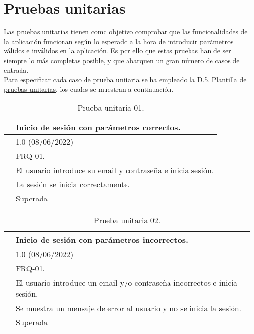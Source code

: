\section{Pruebas unitarias}

Las pruebas unitarias \cite{pruebaunitaria} tienen como objetivo comprobar que las funcionalidades de la aplicación funcionan según lo esperado a la hora de introducir parámetros válidos e inválidos en la aplicación. Es por ello que estas pruebas han de ser siempre lo más completas posible, y que abarquen un gran número de casos de entrada. 
\\

Para especificar cada caso de prueba unitaria se ha empleado la \hyperref[enlacePUX]{D.5. Plantilla de pruebas unitarias}, los cuales se muestran a continuación.

\begin{table}[H]
\begin{center}
\begin{tabular}{|p{3cm}|p{10cm}|} \hline
\centering {\bf PU-01} & Inicio de sesión con parámetros correctos.  \\ \hline\hline
\centering {\bf Versión} & 1.0 (08/06/2022) \\ \hline
\centering {\bf Dependencias} &  FRQ-01. \\ \hline
\centering {\bf Descripción} &  El usuario introduce su email y contraseña e inicia sesión. \\ \hline
\centering {\bf Criterio de aceptación} & La sesión se inicia correctamente. \\ \hline
\centering {\bf Estado} & Superada \\ \hline
\end{tabular}
\caption{Prueba unitaria 01.}
\label{enlacePU1}
\end{center}
\end{table}

\begin{table}[H]
\begin{center}
\begin{tabular}{|p{3cm}|p{10cm}|} \hline
\centering {\bf PU-02} & Inicio de sesión con parámetros incorrectos.  \\ \hline\hline
\centering {\bf Versión} & 1.0 (08/06/2022) \\ \hline
\centering {\bf Dependencias} & FRQ-01. \\ \hline
\centering {\bf Descripción} &  El usuario introduce un email y/o contraseña incorrectos e inicia sesión. \\ \hline
\centering {\bf Criterio de aceptación} & Se muestra un mensaje de error al usuario y no se inicia la sesión. \\ \hline
\centering {\bf Estado} & Superada \\ \hline
\end{tabular}
\caption{Prueba unitaria 02.}
\label{enlacePU2}
\end{center}
\end{table}

